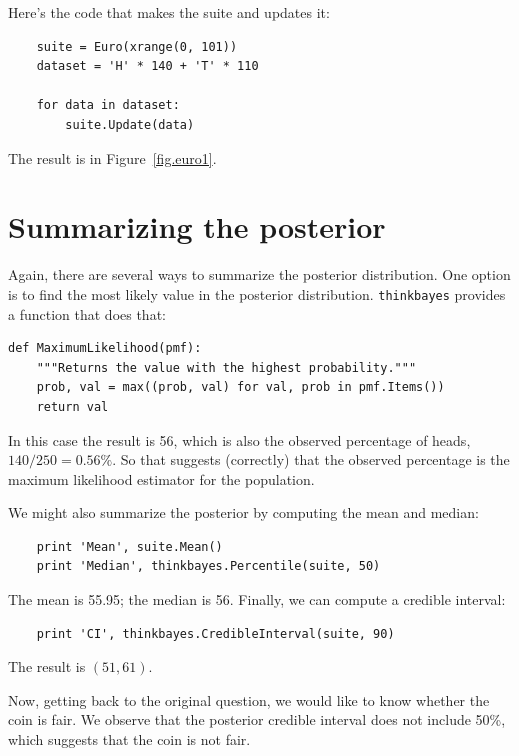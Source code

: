 \documentclass[12pt]{book}
\begin{document}
Here's the code that makes the suite and updates it:

\begin{verbatim}
    suite = Euro(xrange(0, 101))
    dataset = 'H' * 140 + 'T' * 110

    for data in dataset:
        suite.Update(data)
\end{verbatim}

The result is in Figure~\ref{fig.euro1}.


\section{Summarizing the posterior}

Again, there are several ways to summarize the posterior distribution.
One option is to find the most likely value in the posterior
distribution.  \verb"thinkbayes" provides a function that does 
that:

\begin{verbatim}
def MaximumLikelihood(pmf):
    """Returns the value with the highest probability."""
    prob, val = max((prob, val) for val, prob in pmf.Items())
    return val
\end{verbatim}

In this case the result is 56, which is also the observed percentage of
heads, $140/250 = 0.56\%$.  So that suggests (correctly) that the
observed percentage is the maximum likelihood estimator
for the population.

We might also summarize the posterior by computing the mean
and median:

\begin{verbatim}
    print 'Mean', suite.Mean()
    print 'Median', thinkbayes.Percentile(suite, 50)
\end{verbatim}

The mean is 55.95; the median is 56.  Finally, we can compute a
credible interval: 

\begin{verbatim}
    print 'CI', thinkbayes.CredibleInterval(suite, 90)
\end{verbatim}

The result is $(51, 61)$.

Now, getting back to the original question, we would like to know
whether the coin is fair.  We observe that the posterior credible
interval does not include 50\%, which suggests that the coin is not
fair.
\end{document}
